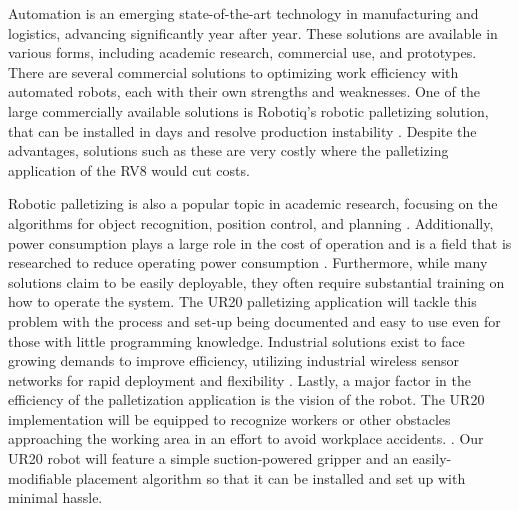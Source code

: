 
Automation is an emerging state-of-the-art technology in manufacturing and logistics, advancing significantly year after year. These solutions are available in various forms, including academic research, commercial use, and prototypes. There are several commercial solutions to optimizing work efficiency with automated robots, each with their own strengths and weaknesses. One of the large commercially available solutions is Robotiq's robotic palletizing solution, that can be installed in days and resolve production instability \cite{Robotiq2024}. Despite the advantages, solutions such as these are very costly where the palletizing application of the RV8 would cut costs.

Robotic palletizing is also a popular topic in academic research, focusing on the algorithms for object recognition, position control, and planning \cite{Xu2022}. Additionally, power consumption plays a large role in the cost of operation and is a field that is researched to reduce operating power consumption \cite{Deng2022}. Furthermore, while many solutions claim to be easily deployable, they often require substantial training on how to operate the system. The UR20 palletizing application will tackle this problem with the process and set-up being documented and easy to use even for those with little programming knowledge. Industrial solutions exist to face growing demands to improve efficiency, utilizing industrial wireless sensor networks for rapid deployment and flexibility \cite{Gungor2009}. Lastly, a major factor in the efficiency of the palletization application is the vision of the robot. The UR20 implementation will be equipped to recognize workers or other obstacles approaching the working area in an effort to avoid workplace accidents. \cite{Abdullah2022}. Our UR20 robot will feature a simple suction-powered gripper and an easily-modifiable placement algorithm so that it can be installed and set up with minimal hassle.
